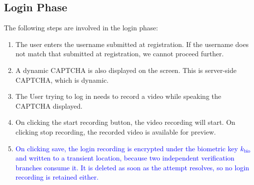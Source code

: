 \documentclass[10pt,journal,compsoc]{IEEEtran}
\begin{document}
\subsection{Login Phase}
The following steps are involved in the login phase:
\begin{enumerate}
    \item The user enters the username submitted at registration. If the username does not match that submitted at registration, we cannot proceed further.
    \item A dynamic CAPTCHA is also displayed on the screen. This is server-side CAPTCHA, which is dynamic.
    \item The User trying to log in needs to record a video while speaking the CAPTCHA displayed.
    \item On clicking the start recording button, the video recording will start. On clicking stop recording, the recorded video is available for preview.
    \item \textcolor{blue}{On clicking save, the login recording is encrypted under the biometric key $k_{\text{bio}}$ and written to a transient location, because two independent verification branches consume it. It is deleted as soon as the attempt resolves, so no login recording is retained either.}
\end{enumerate}
\end{document}
